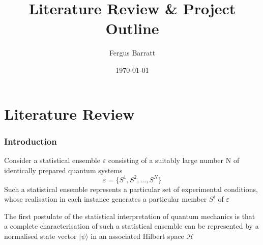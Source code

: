 \documentclass[reqno]{amsart}
\title{Literature Review \& Project Outline}
\author{Fergus Barratt}
\date{\today}
\begin{document}
\maketitle
%

\part{Literature Review}
\section{Introduction\autocite{Breuer2002}}
Consider a statistical ensemble $\varepsilon$ consisting of a suitably large number N of identically prepared quantum systems
\begin{equation}
  \varepsilon = \{S^1, S^2, \ldots, S^N\}
\end{equation}
Such a statistical ensemble represents a particular set of experimental conditions, whose realisation in each instance generates a particular member $S^i$ of  $\varepsilon$

The first postulate of the statistical interpretation of quantum mechanics is that a complete characterisation of such a statistical ensemble can be represented by a normalised state vector $| \psi \rangle$ in an associated Hilbert space $\mathcal{H}$
\end{document}
